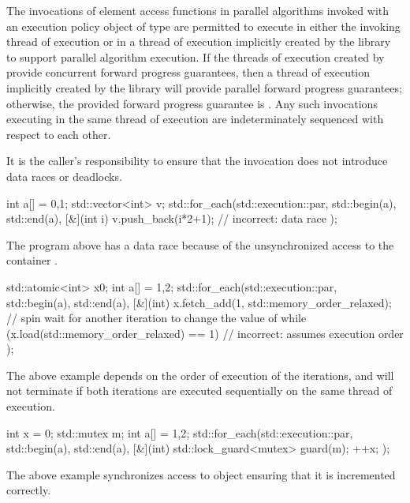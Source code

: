 \pnum
The invocations of element access functions in parallel algorithms invoked with
an execution policy object of type  are
permitted to execute in either the invoking thread of execution or in a
thread of execution implicitly
created by the library to support parallel algorithm execution.
If the threads of execution created by  provide concurrent
forward progress guarantees, then a thread of execution
implicitly created by the library will provide parallel forward progress guarantees;
otherwise, the provided forward progress guarantee is
.
Any such
invocations executing in the same thread of execution are indeterminately sequenced with
respect to each other.
\begin{note}
It is the caller's responsibility to ensure that the
invocation does not introduce data races or deadlocks.
\end{note}
\begin{example}
\begin{codeblock}
int a[] = {0,1};
std::vector<int> v;
std::for_each(std::execution::par, std::begin(a), std::end(a), [&](int i) {
  v.push_back(i*2+1); // incorrect: data race
});
\end{codeblock}
The program above has a data race because of the unsynchronized access to the
container .
\end{example}
\begin{example}
\begin{codeblock}
std::atomic<int> x{0};
int a[] = {1,2};
std::for_each(std::execution::par, std::begin(a), std::end(a), [&](int) {
  x.fetch_add(1, std::memory_order_relaxed);
  // spin wait for another iteration to change the value of 
  while (x.load(std::memory_order_relaxed) == 1) { } // incorrect: assumes execution order
});
\end{codeblock}
The above example depends on the order of execution of the iterations, and
will not terminate if both iterations are executed sequentially on the same
thread of execution.
\end{example}
\begin{example}
\begin{codeblock}
int x = 0;
std::mutex m;
int a[] = {1,2};
std::for_each(std::execution::par, std::begin(a), std::end(a), [&](int) {
  std::lock_guard<mutex> guard(m);
  ++x;
});
\end{codeblock}
The above example synchronizes access to object  ensuring that it is
incremented correctly.
\end{example}

